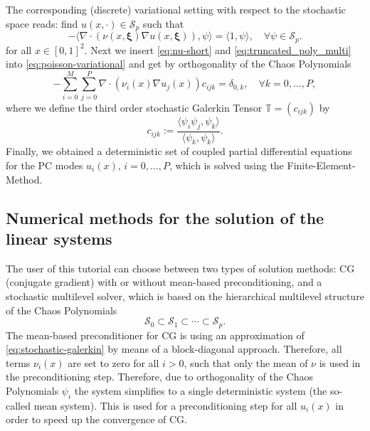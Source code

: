\documentclass{article}
\begin{document}
The corresponding (discrete) variational setting with respect to the stochastic space reads: find $u(x,\cdot) \in \mathcal{S}_p$ such that
\begin{equation}
\label{eq:poisson-variational}
-\langle \nabla\cdot(\nu(x,\bm\xi)\nabla u(x,\bm\xi)),\psi \rangle = \langle 1,\psi \rangle,\quad \forall \psi \in \mathcal{S}_p.
\end{equation}
for all $x \in [0,1]^2$. Next we insert \eqref{eq:nu-short} and \eqref{eq:truncated_poly_multi} into \eqref{eq:poisson-variational} and get by orthogonality of the Chaos Polynomials
\begin{equation}
\label{eq:stochastic-galerkin}
-\sum_{i=0}^M\sum_{j=0}^P \nabla\cdot(\nu_i(x)\nabla u_j(x)) c_{ijk} = \delta_{0,k},\quad \forall k=0,\ldots,P,
\end{equation}
where we define the third order stochastic Galerkin Tensor $\mathbb{T} = (c_{ijk})$ by \cite{maitre2010spectral}
\begin{equation}
c_{ijk} := \dfrac{\langle \psi_i\psi_j,\psi_k \rangle}{\langle \psi_k,\psi_k \rangle}.
\end{equation}
Finally, we obtained a deterministic set of coupled partial differential equations for the PC modes $u_i(x),\, i=0,\ldots,P$, which is solved using the Finite-Element-Method.

\subsection{Numerical methods for the solution of the linear systems}
The user of this tutorial can choose between two types of solution methods: CG (conjugate gradient) with or without mean-based preconditioning, and a stochastic multilevel solver, which is based on the hierarchical multilevel structure of the Chaos Polynomials
\begin{equation*}
\mathcal{S}_0 \subset \mathcal{S}_1 \subset \cdots \subset \mathcal{S}_p.
\end{equation*}
The mean-based preconditioner for CG is using an approximation of \eqref{eq:stochastic-galerkin} by means of a block-diagonal approach. Therefore, all terms $\nu_i(x)$ are set to zero for all $i > 0$, such that only the mean of $\nu$ is used in the preconditioning step. Therefore, due to orthogonality of the Chaos Polynomials $\psi_i$ the system simplifies to a single deterministic system (the so-called mean system). This is used for a preconditioning step for all $u_i(x)$ in order to speed up the convergence of CG. 
\end{document}

